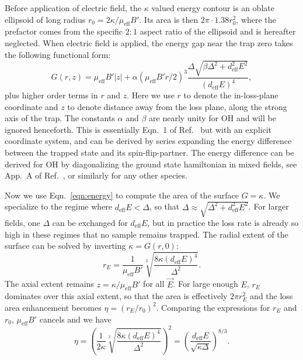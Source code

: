 \documentclass[%
 reprint,
 amsmath,amssymb,
 aps,
pra,
]{revtex4-1}
\begin{document}
Before application of electric field, the $\kappa$ valued energy contour is an oblate ellipsoid of long radius $r_0=2\kappa/\mu_\text{eff}B'$. 
Its area is then $2\pi\cdot1.38r_0^2$, where the prefactor comes from the specific $2:1$ aspect ratio of the ellipsoid and is hereafter neglected.
When electric field is applied, the energy gap near the trap zero takes the following functional form:
\begin{equation}
\label{eqn:energy}
G(r,z) = \mu_\text{eff}B'|z| + \alpha(\mu_\text{eff}B'r/2)^3\frac{\Delta\sqrt{\beta\Delta^2+d_\text{eff}^2E^2}}{(d_\text{eff}E)^4},%
\end{equation}
plus higher order terms in $r$ and $z$. 
Here we use $r$ to denote the in-loss-plane coordinate and $z$ to denote distance away from the loss plane, along the strong axis of the trap. 
The constants $\alpha$ and $\beta$ are nearly unity for OH and will be ignored henceforth.
This is essentially Eqn.~1 of Ref.~\cite{smt} but with an explicit coordinate system, and can be derived by series expanding the energy difference between the trapped state and its spin-flip-partner.
The energy difference can be derived for OH by diagonalizing the ground state hamiltonian in mixed fields, see App.~A of Ref.~\cite{stuhl2012uwave}, or similarly for any other species.

Now we use Eqn.~\ref{eqn:energy} to compute the area of the surface $G=\kappa$.
We specialize to the regime where $d_\text{eff}E<\Delta$, so that $\Delta\approx\sqrt{\Delta^2+d_\text{eff}^2E^2}$. 
For larger fields, one $\Delta$ can be exchanged for $d_\text{eff}E$, but in practice the loss rate is already so high in these regimes that no sample remains trapped.
The radial extent of the surface can be solved by inverting $\kappa=G(r,0)$:
\begin{equation}
\label{eqn:rE}
r_E = \frac{1}{\mu_\text{eff}B'}\sqrt[3]{\frac{8\kappa(d_\text{eff}E)^4}{\Delta^2}}.
\end{equation}
The axial extent remains $z=\kappa/\mu_\text{eff}B'$ for all $\vec{E}$.
For large enough $E$, $r_E$ dominates over this axial extent, so that the area is effectively $2\pi r_E^2$ and the loss area enhancement becomes $\eta = (r_E/r_0)^2$.
Comparing the expressions for $r_E$ and $r_0$, $\mu_\text{eff}B'$ cancels and we have
\begin{equation}
\label{eqn:eta}
\eta= \left(\frac{1}{2\kappa}\sqrt[3]{\frac{8\kappa(d_\text{eff}E)^4}{\Delta^2}}\right)^2=\left(\frac{d_\text{eff}E}{\sqrt{\kappa\Delta}}\right)^{8/3}.
\end{equation}
\end{document}
